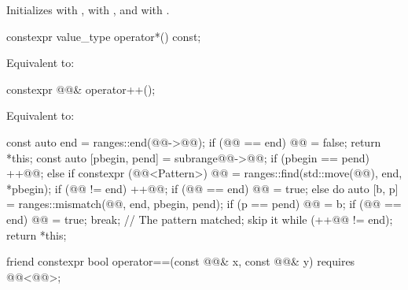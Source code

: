 \begin{itemdescr}
\pnum
\effects
Initializes  with ,
 with , and
 with .
\end{itemdescr}

%
\begin{itemdecl}
constexpr value_type operator*() const;
\end{itemdecl}

\begin{itemdescr}
\pnum
\effects
Equivalent to: 
\end{itemdescr}

%
\begin{itemdecl}
constexpr @@& operator++();
\end{itemdecl}

\begin{itemdescr}
\pnum
\effects
Equivalent to:
\begin{codeblock}
const auto end = ranges::end(@@->@@);
if (@@ == end) {
  @@ = false;
  return *this;
}
const auto [pbegin, pend] = subrange{@@->@@};
if (pbegin == pend) ++@@;
else if constexpr (@@<Pattern>) {
  @@ = ranges::find(std::move(@@), end, *pbegin);
  if (@@ != end) {
    ++@@;
    if (@@ == end)
      @@ = true;
  }
}
else {
  do {
    auto [b, p] = ranges::mismatch(@@, end, pbegin, pend);
    if (p == pend) {
      @@ = b;
      if (@@ == end)
        @@ = true;
      break;            // The pattern matched; skip it
    }
  } while (++@@ != end);
}
return *this;
\end{codeblock}
\end{itemdescr}

%
\begin{itemdecl}
friend constexpr bool operator==(const @@& x, const @@& y)
  requires @@<@@>;
\end{itemdecl}

